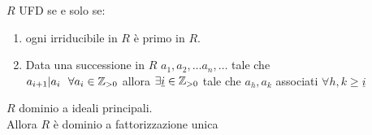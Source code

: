 \documentclass[12px]{article}
\begin{document}
	  \begin{teo}
	  	$R$ UFD se e solo se:
		\begin{enumerate}
			\item ogni irriducibile in $R$ è primo in $R$.
		\item Data una successione in  $R$ $a_1,a_2,\ldots a_n, \ldots$ tale che \\ $a_{i+1}|a_i \ \ \forall a_i\in\mathbb{Z}_{>0}$ 
			allora $\exists \underline i\in \mathbb{Z}_{>0}$ tale che $a_h,a_k$ associati $\forall h,k\geq\underline i$
		\end{enumerate}
	  \end{teo}
	  \begin{teo}
		  $R$ dominio a ideali principali.\\
		  Allora $R$ è dominio a fattorizzazione unica
	  \end{teo}
\end{document}
